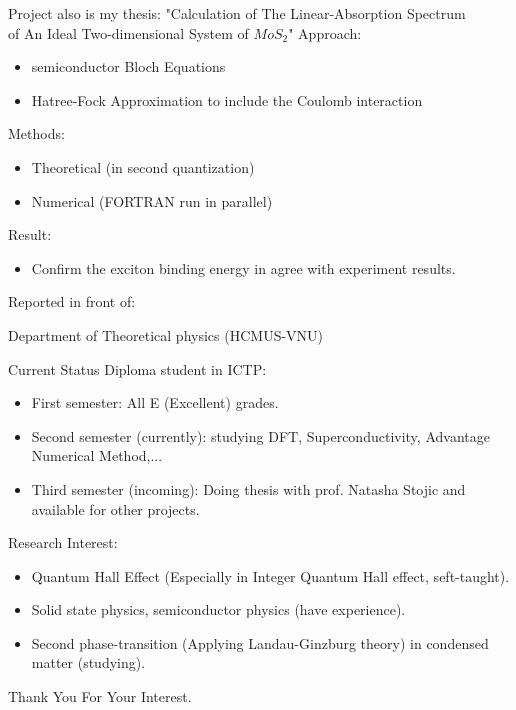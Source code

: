 \documentclass{beamer}
\begin{document}
\begin{frame}{Project also is my thesis:}
"Calculation of The Linear-Absorption Spectrum \\\hspace{4cm}of An Ideal Two-dimensional
System of \(MoS_2\)"
Approach:
\begin{itemize}
\item semiconductor Bloch Equations
\item Hatree-Fock Approximation to include the Coulomb interaction
\end{itemize}
Methods:
\begin{itemize}
	\item Theoretical (in second quantization)\\
	\item Numerical (FORTRAN run in parallel)
\end{itemize}
Result:\\
\begin{itemize}
\item Confirm the exciton binding energy in agree with experiment results.\\
\end{itemize}
Reported in front of:
\begin{center}
	Department of Theoretical physics (HCMUS-VNU)
\end{center}
\end{frame}
\begin{frame}{Current Status}
Diploma student in ICTP:
\begin{itemize}
\item First semester: All E (Excellent) grades.\\
\item Second semester (currently): studying DFT, Superconductivity, Advantage Numerical Method,...\\
\item Third semester (incoming): Doing thesis with prof. Natasha Stojic and available for other projects.
\end{itemize}
Research Interest:
\begin{itemize}
\item Quantum Hall Effect (Especially in Integer Quantum Hall effect, seft-taught).
\item Solid state physics, semiconductor physics (have experience).
\item Second phase-transition (Applying Landau-Ginzburg theory) in condensed matter (studying).
\end{itemize}
\end{frame}
\begin{frame}
\begin{center}
	Thank You For Your Interest.
\end{center}
\end{frame}
\end{document}

